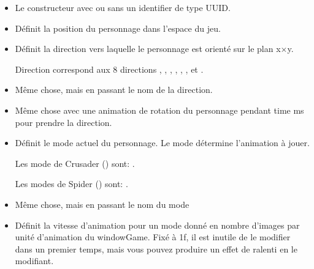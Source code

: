 \documentclass[11pt]{article}
\begin{document}
\begin{itemize}

    \item Le constructeur avec ou sans un identifier de type UUID.

    \item {}

    Définit la position du personnage dans l'espace du jeu.

    \item {}

    Définit la direction vers laquelle le personnage est orienté sur le plan x$\times$y.

    Direction correspond aux 8 directions , , , 
    , , ,  et .

    \item {}

    Même chose, mais en passant le nom de la direction.

    \item {}

    Même chose avec une animation de rotation du personnage pendant time ms pour prendre la direction.

    \item {}

    Définit le mode actuel du personnage.
    Le mode détermine l'animation à jouer.

    Les mode de Crusader () sont:
    .

    Les modes de Spider () sont:
    .

    \item {}

    Même chose, mais en passant le nom du mode

    \item {}

        Définit la vitesse d'animation pour un mode donné en nombre d'images par unité d'animation du windowGame. 
        Fixé à 1f, il est inutile de le modifier dans un premier temps, mais vous pouvez produire un effet de ralenti en le modifiant.


\end{itemize}
\end{document}
